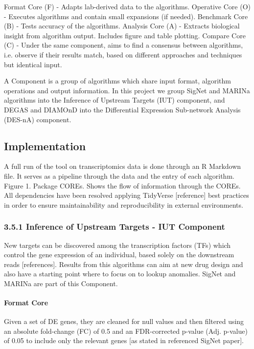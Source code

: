 Format Core (F) - Adapts lab-derived data to the algorithms.
Operative Core (O) - Executes algorithms and contain small expansions (if needed).
Benchmark Core (B) - Tests accuracy of the algorithms.
Analysis Core (A) - Extracts biological insight from algorithm output. Includes figure and table plotting.
Compare Core (C) - Under the same component, aims to find a consensus between algorithms, i.e. observe if their results match, based on different approaches and techniques but identical input.


A Component is a group of algorithms which share input format, algorithm operations and output information. In this project we group SigNet and MARINa algorithms into the Inference of Upstream Targets (IUT) component, and DEGAS and DIAMOnD into the Differential Expression Sub-network Analysis (DES-nA) component.


\subsection{Implementation}
A full run of the tool on transcriptomics data is done through an R Markdown file. It serves as a pipeline through the data and the entry of each algorithm.
Figure 1. Package COREs. Shows the flow of information through the COREs.
All dependencies have been resolved applying TidyVerse [reference] best practices in order to ensure maintainability and reproducibility in external environments.


\subsubsection{3.5.1 Inference of Upstream Targets - IUT Component}
New targets can be discovered among the transcription factors (TFs) which control the gene expression of an individual, based solely on the downstream reads [references]. Results from this algorithms can aim at new drug design and also have a starting point where to focus on to lookup anomalies. SigNet and MARINa are part of this Component.


\paragraph{Format Core}
Given a set of DE genes, they are cleaned for null values and then filtered using an absolute fold-change (FC) of 0.5 and an FDR-corrected p-value (Adj. p-value) of 0.05 to include only the relevant genes [as stated in referenced SigNet paper].


